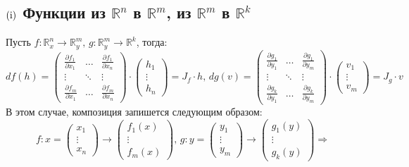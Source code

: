 \documentclass[12pt]{article}
\newcommand{\RN}[1]{%
	\textup{\uppercase\expandafter{\romannumeral#1}}%
}
\newcommand{\MR}{\mathbb{R}}
\theoremstyle{definition}
\begin{document}
\subsection*{$(\RN{1})$ Функции из $\MR^n$ в $\MR^m$, из $\MR^m$ в $\MR^k$}
Пусть $f \colon \MR_x^n \to \MR_y^m, \, g \colon \MR_y^m \to \MR^k$, тогда:
$$
	df(h) = \begin{pmatrix}
		\tfrac{\partial f_1}{\partial x_1} &  \dotsc & \tfrac{\partial f_1}{\partial x_n} \\
		\vdots & \ddots & \vdots \\
		\tfrac{\partial f_m}{\partial x_1} & \dotsc & \tfrac{\partial f_m}{\partial x_n} 			
	\end{pmatrix}{\cdot}
	\begin{pmatrix}
		h_1\\
		\vdots\\
		h_n
	\end{pmatrix} = J_f{\cdot} h, \, 
	dg(v) = \begin{pmatrix}
		\tfrac{\partial g_1}{\partial y_1} &  \dotsc & \tfrac{\partial g_1}{\partial y_m} \\
		\vdots & \ddots & \vdots \\
		\tfrac{\partial g_k}{\partial y_1} & \dotsc & \tfrac{\partial g_k}{\partial y_m} 			
	\end{pmatrix}{\cdot}
	\begin{pmatrix}
		v_1\\
		\vdots\\
		v_m
	\end{pmatrix} = J_g{\cdot}v
$$
В этом случае, композиция запишется следующим образом:
$$
	f \colon x =\begin{pmatrix}
		x_1\\
		\vdots\\
		x_n
	\end{pmatrix} \to
	\begin{pmatrix}
		f_1(x)\\
		\vdots\\
		f_m(x)
	\end{pmatrix}, \, 
	g \colon y = \begin{pmatrix}
		y_1\\
		\vdots\\
		y_m
	\end{pmatrix} \to
	\begin{pmatrix}
		g_1(y)\\
		\vdots\\
		g_k(y)
	\end{pmatrix} \Rightarrow 
$$
\end{document}

